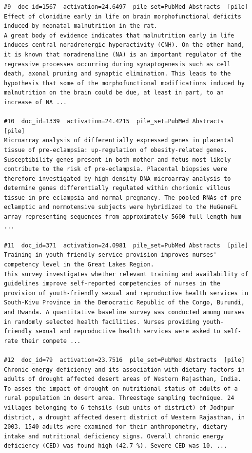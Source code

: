 \begin{verbatim}
#9  doc_id=1567  activation=24.6497  pile_set=PubMed Abstracts  [pile]
Effect of clonidine early in life on brain morphofunctional deficits induced by neonatal malnutrition in the rat.
A great body of evidence indicates that malnutrition early in life induces central noradrenergic hyperactivity (CNH). On the other hand, it is known that noradrenaline (NA) is an important regulator of the regressive processes occurring during synaptogenesis such as cell death, axonal pruning and synaptic elimination. This leads to the hypothesis that some of the morphofunctional modifications induced by malnutrition on the brain could be due, at least in part, to an increase of NA ...

#10  doc_id=1339  activation=24.4215  pile_set=PubMed Abstracts  [pile]
Microarray analysis of differentially expressed genes in placental tissue of pre-eclampsia: up-regulation of obesity-related genes.
Susceptibility genes present in both mother and fetus most likely contribute to the risk of pre-eclampsia. Placental biopsies were therefore investigated by high-density DNA microarray analysis to determine genes differentially regulated within chorionic villous tissue in pre-eclampsia and normal pregnancy. The pooled RNAs of pre-eclamptic and normotensive subjects were hybridized to the HuGeneFL array representing sequences from approximately 5600 full-length hum ...

#11  doc_id=371  activation=24.0981  pile_set=PubMed Abstracts  [pile]
Training in youth-friendly service provision improves nurses' competency level in the Great Lakes Region.
This survey investigates whether relevant training and availability of guidelines improve self-reported competencies of nurses in the provision of youth-friendly sexual and reproductive health services in South-Kivu Province in the Democratic Republic of the Congo, Burundi, and Rwanda. A quantitative baseline survey was conducted among nurses in randomly selected health facilities. Nurses providing youth-friendly sexual and reproductive health services were asked to self-rate their compete ...

#12  doc_id=79  activation=23.7516  pile_set=PubMed Abstracts  [pile]
Chronic energy deficiency and its association with dietary factors in adults of drought affected desert areas of Western Rajasthan, India.
To asses the impact of drought on nutritional status of adults of a rural population in desert area. Threestage sampling technique. 24 villages belonging to 6 tehsils (sub units of district) of Jodhpur district, a drought affected desert district of Western Rajasthan, in 2003. 1540 adults were examined for their anthropometry, dietary intake and nutritional deficiency signs. Overall chronic energy deficiency (CED) was found high (42.7 %). Severe CED was 10. ...


\end{verbatim}
